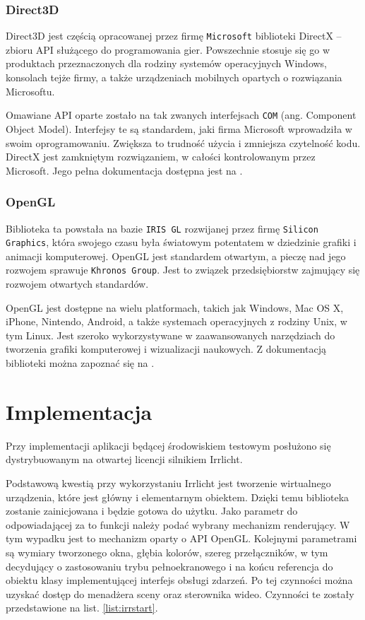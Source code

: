 \documentclass[11pt]{mwrep}
\begin{document}
      \subsubsection{Direct3D}

      Direct3D jest częścią opracowanej przez firmę \texttt{Microsoft} biblioteki DirectX -- zbioru API służącego do programowania gier. Powszechnie stosuje się go w produktach przeznaczonych dla rodziny systemów operacyjnych Windows, konsolach tejże firmy, a także urządzeniach mobilnych opartych o rozwiązania Microsoftu.
 
      Omawiane API oparte zostało na tak zwanych interfejsach \texttt{COM} (ang. Component Object Model). Interfejsy te są standardem, jaki firma Microsoft wprowadziła w swoim oprogramowaniu. Zwiększa to trudność użycia i zmniejsza czytelność kodu. DirectX jest zamkniętym rozwiązaniem,  w całości kontrolowanym przez Microsoft. Jego pełna dokumentacja dostępna jest na \cite{dx}.

      \subsubsection{OpenGL}

      Biblioteka ta powstała na bazie \texttt{IRIS GL} rozwijanej przez firmę \texttt{Silicon Graphics}, która swojego czasu była światowym potentatem w dziedzinie grafiki i animacji komputerowej. OpenGL jest standardem otwartym, a pieczę nad jego rozwojem sprawuje \texttt{Khronos Group}. Jest to związek przedsiębiorstw zajmujący się rozwojem otwartych standardów.

      OpenGL jest dostępne na wielu platformach, takich jak Windows, Mac OS X, iPhone, Nintendo, Android, a także systemach operacyjnych z rodziny Unix, w tym Linux. Jest szeroko wykorzystywane w zaawansowanych narzędziach do tworzenia grafiki komputerowej i wizualizacji naukowych. Z dokumentacją biblioteki można zapoznać się na \cite{opengl}.

  \section{Implementacja}

Przy implementacji aplikacji będącej środowiskiem testowym posłużono się dystrybuowanym na otwartej licencji silnikiem Irrlicht.

Podstawową kwestią przy wykorzystaniu Irrlicht jest tworzenie wirtualnego urządzenia, które jest główny i elementarnym obiektem. Dzięki temu biblioteka zostanie zainicjowana i będzie gotowa do użytku. Jako parametr do odpowiadającej za to funkcji należy podać wybrany mechanizm renderujący. W tym wypadku jest to mechanizm oparty o API OpenGL. Kolejnymi parametrami są wymiary tworzonego okna, głębia kolorów, szereg przełączników, w tym decydujący o zastosowaniu trybu pełnoekranowego i na końcu referencja do obiektu klasy implementującej interfejs obsługi zdarzeń. Po tej czynności można uzyskać dostęp do menadżera sceny oraz sterownika wideo. Czynności te zostały przedstawione na list. \ref{list:irrstart}.
\end{document}
